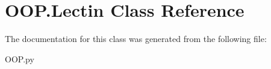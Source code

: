\hypertarget{class_o_o_p_1_1_lectin}{}\section{O\+O\+P.\+Lectin Class Reference}
\label{class_o_o_p_1_1_lectin}


The documentation for this class was generated from the following file\+:\begin{DoxyCompactItemize}
\item 
O\+O\+P.\+py\end{DoxyCompactItemize}
